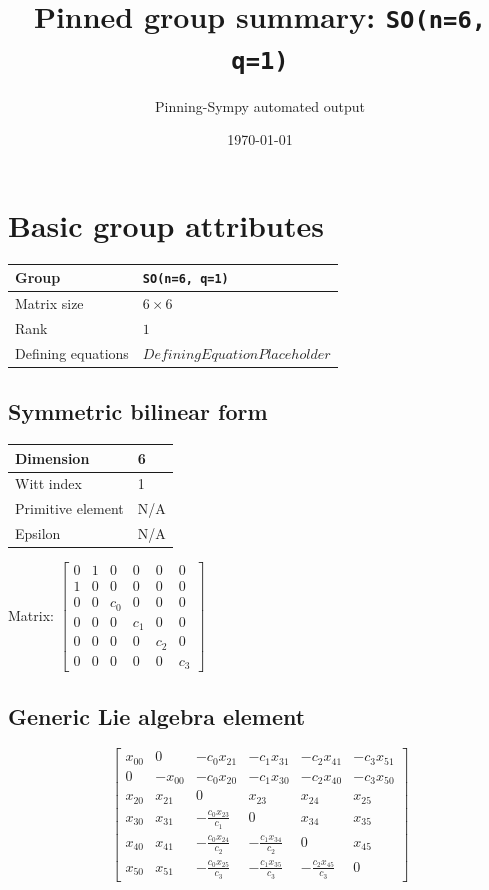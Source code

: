 \documentclass[11pt]{article}
\title{Pinned group summary: \texttt{SO(n=6, q=1)}}
\author{Pinning-Sympy automated output}
\date{\today}
\theoremstyle{definition}
\begin{document}
\maketitle
\tableofcontents

\newpage

\section{Basic group attributes}

\begin{tabular}{|l|l|}
	\hline
    Group & \texttt{SO(n=6, q=1)} \\
	\hline
    Matrix size & $6 \times 6$ \\
	\hline
    Rank & $1$ \\
	\hline
	Defining equations & $DefiningEquationPlaceholder$ \\
	\hline
\end{tabular}

\subsection{Symmetric bilinear form}
\begin{tabular}{|l|l|}
    \hline
    Dimension & 6 \\
    \hline
    Witt index & 1 \\
    \hline
    Primitive element & N/A \\
    \hline
    Epsilon & N/A \\
    \hline
\end{tabular}

\bigskip
\noindent Matrix: \(
\left[\begin{matrix}0 & 1 & 0 & 0 & 0 & 0\\1 & 0 & 0 & 0 & 0 & 0\\0 & 0 & c_{0} & 0 & 0 & 0\\0 & 0 & 0 & c_{1} & 0 & 0\\0 & 0 & 0 & 0 & c_{2} & 0\\0 & 0 & 0 & 0 & 0 & c_{3}\end{matrix}\right]
\)



\subsection{Generic Lie algebra element}
\[
\left[\begin{matrix}x_{0 0} & 0 & - c_{0} x_{2 1} & - c_{1} x_{3 1} & - c_{2} x_{4 1} & - c_{3} x_{5 1}\\0 & - x_{0 0} & - c_{0} x_{2 0} & - c_{1} x_{3 0} & - c_{2} x_{4 0} & - c_{3} x_{5 0}\\x_{2 0} & x_{2 1} & 0 & x_{2 3} & x_{2 4} & x_{2 5}\\x_{3 0} & x_{3 1} & - \frac{c_{0} x_{2 3}}{c_{1}} & 0 & x_{3 4} & x_{3 5}\\x_{4 0} & x_{4 1} & - \frac{c_{0} x_{2 4}}{c_{2}} & - \frac{c_{1} x_{3 4}}{c_{2}} & 0 & x_{4 5}\\x_{5 0} & x_{5 1} & - \frac{c_{0} x_{2 5}}{c_{3}} & - \frac{c_{1} x_{3 5}}{c_{3}} & - \frac{c_{2} x_{4 5}}{c_{3}} & 0\end{matrix}\right]
\]
\end{document}
